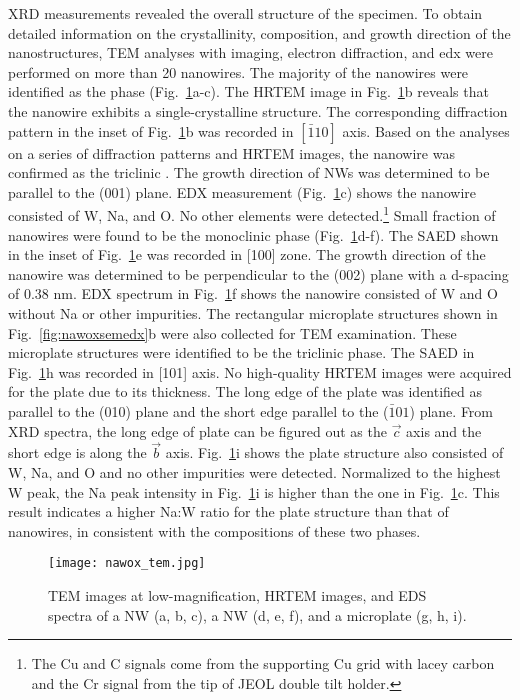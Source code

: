 XRD measurements revealed the overall structure of the specimen. To obtain detailed information on the crystallinity, composition, and growth direction of the nanostructures, TEM analyses with imaging, electron diffraction, and \gls{edx} were performed on more than 20 nanowires. The majority of the nanowires were identified as the  phase (Fig.~\ref{fig:nawoxtem}a-c). The HRTEM image in Fig.~\ref{fig:nawoxtem}b reveals that the nanowire exhibits a single-crystalline structure. The corresponding diffraction pattern in the inset of Fig.~\ref{fig:nawoxtem}b was recorded in $[\bar{1}10]$ axis. Based on the analyses on a series of diffraction patterns and HRTEM images, the nanowire was confirmed as the triclinic . The growth direction of  NWs was determined to be parallel to the (001) plane. EDX measurement (Fig.~\ref{fig:nawoxtem}c) shows the nanowire consisted of W, Na, and O. No other elements were detected.\footnote{The Cu and C signals come from the supporting Cu grid with lacey carbon and the Cr signal from the tip of JEOL double tilt holder.} Small fraction of nanowires were found to be the monoclinic  phase (Fig.~\ref{fig:nawoxtem}d-f). The SAED shown in the inset of Fig.~\ref{fig:nawoxtem}e was recorded in [100] zone. The growth direction of the  nanowire was determined to be perpendicular to the (002) plane with a d-spacing of 0.38 nm. EDX spectrum in Fig.~\ref{fig:nawoxtem}f shows the nanowire consisted of W and O without Na or other impurities. The rectangular microplate structures shown in Fig.~\ref{fig:nawoxsemedx}b were also collected for TEM examination. These microplate structures were identified to be the triclinic  phase. The SAED in Fig.~\ref{fig:nawoxtem}h was recorded in [101] axis. No high-quality HRTEM images were acquired for the  plate due to its thickness. The long edge of the plate was identified as parallel to the (010) plane and the short edge parallel to the ($\bar{1}01$) plane. From XRD spectra, the long edge of  plate can be figured out as the $\vec{c}$ axis and the short edge is along the $\vec{b}$ axis. Fig.~\ref{fig:nawoxtem}i shows the plate structure also consisted of W, Na, and O and no other impurities were detected. Normalized to the highest W peak, the Na peak intensity in Fig.~\ref{fig:nawoxtem}i is higher than the one in Fig.~\ref{fig:nawoxtem}c. This result indicates a higher Na:W ratio for the  plate structure than that of  nanowires, in consistent with the compositions of these two phases.
\begin{figure}[htb]
\centering
\texttt{[image: nawox\_tem.jpg]}
\caption[TEM analyses on sodium tungsten oxides sample]{TEM images at low-magnification, HRTEM images, and EDS spectra of a  NW (a, b, c), a  NW (d, e, f), and a  microplate (g, h, i).}
\label{fig:nawoxtem}
\end{figure}

